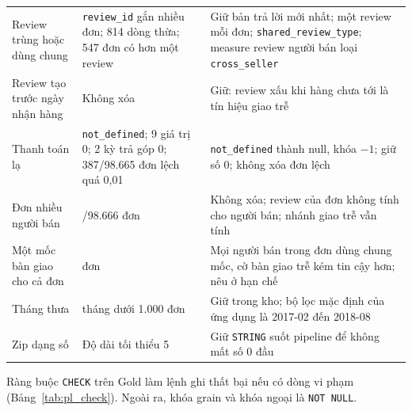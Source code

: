 \documentclass[a4paper]{article}
\begin{document}
{\begin{longtable}{@{}>{\raggedright\arraybackslash}p{3.4cm}>{\raggedright\arraybackslash}p{4.6cm}>{\raggedright\arraybackslash}p{8.2cm}@{}}
\addlinespace
Review trùng hoặc dùng chung & 789 \texttt{review\_\allowbreak{}id} gắn nhiều đơn; 814 dòng thừa; 547 đơn có hơn một review & Giữ bản trả lời mới nhất; một review mỗi đơn; \texttt{shared\_\allowbreak{}review\_\allowbreak{}type}; measure review người bán loại \texttt{cross\_\allowbreak{}seller} \\
\addlinespace
Review tạo trước ngày nhận hàng & Không xóa & Giữ: review xấu khi hàng chưa tới là tín hiệu giao trễ \\
\addlinespace
Thanh toán lạ & 3 \texttt{not\_\allowbreak{}defined}; 9 giá trị 0; 2 kỳ trả góp 0; 387/98.665 đơn lệch quá 0,01 & \texttt{not\_\allowbreak{}defined} thành null, khóa $-1$; giữ số 0; không xóa đơn lệch \\
\addlinespace
Đơn nhiều người bán & 1.278/98.666 đơn & Không xóa; review của đơn không tính cho người bán; nhánh giao trễ vẫn tính \\
\addlinespace
Một mốc bàn giao cho cả đơn & 1.278 đơn & Mọi người bán trong đơn dùng chung mốc, cờ bàn giao trễ kém tin cậy hơn; nêu ở hạn chế \\
\addlinespace
Tháng thưa & 6 tháng dưới 1.000 đơn & Giữ trong kho; bộ lọc mặc định của ứng dụng là 2017-02 đến 2018-08 \\
\addlinespace
Zip dạng số & Độ dài tối thiểu 5 & Giữ \texttt{STRING} suốt pipeline để không mất số 0 đầu \\
\end{longtable}
}

Ràng buộc \texttt{CHECK} trên Gold làm lệnh ghi thất bại nếu có dòng vi phạm (Bảng~\ref{tab:pl_check}). Ngoài ra, khóa grain và khóa ngoại là \texttt{NOT NULL}.
\end{document}
